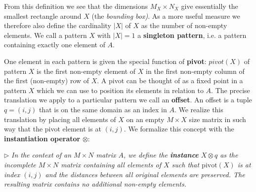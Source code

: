 \documentclass{llncs}
\begin{document}
\smallskip

From this definition we see that the dimensions $M_X\times N_X$ give essentially the smallest rectangle around $X$ (the \emph{bounding box)}. As a more useful measure we therefore also define the cardinality $|X|$ of $X$ as the number of non-empty elements. We call a pattern $X$ with $|X|=1$ a \textbf{singleton pattern}, i.e. a pattern containing exactly one element of $A$. %

One element in each pattern is given the special function of \textbf{pivot}: %
$pivot(X)$ of pattern $X$ is the first non-empty element of $X$ in the first non-empty column of the first (non-empty) row of $X$.
\noindent
A pivot can be thought of as a fixed point in a pattern $X$ which we can use to position its elements in relation to $A$. The precise translation we apply to a particular pattern we call an \textbf{offset}. An offset is a tuple ${q}=(i,j)$ that is on the same domain as an index in $A$. We realize this translation by placing all elements of $X$ on an empty $M\times X$ size matrix in such way that the pivot element is at $(i,j)$. We formalize this concept with the \textbf{instantiation operator} $\otimes$:

\smallskip
\noindent $\triangleright$
\emph{In the context of an $M\times N$ matrix $A$, we define the \textbf{instance} $X \otimes {q}$ as the incomplete $M\times N$ matrix containing all elements of $X$ such that $\mathrm{pivot}(X)$ is at index $(i,j)$ and the distances between all original elements are preserved. The resulting matrix contains no additional non-empty elements. } %
\smallskip
\end{document}
